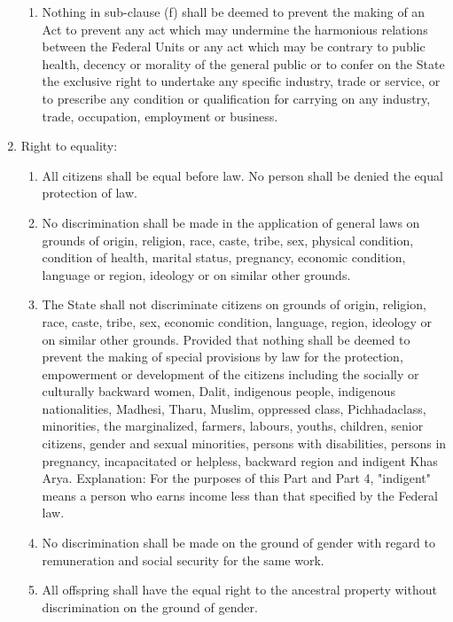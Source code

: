\begin{questions}
\begin{solution}
\begin{enumerate}
\begin{enumerate}
          \item Nothing in sub-clause (f) shall be deemed to prevent the making of an Act to prevent any act which may undermine the harmonious relations between the Federal Units or any act which may be contrary to public health, decency or morality of the general public or to confer on the State the exclusive right to undertake any specific industry, trade or service, or to prescribe any condition or qualification for carrying on any industry, trade, occupation, employment or business.
      \end{enumerate}

\item Right to equality:
\begin{enumerate}
    \item All citizens shall be equal before law. No person shall be denied the equal protection of law.
    \item No discrimination shall be made in the application of general laws on grounds of origin, religion, race, caste, tribe, sex, physical condition, condition of health, marital status, pregnancy, economic condition, language or region, ideology or on similar other grounds.
    \item The State shall not discriminate citizens on grounds of origin, religion, race, caste, tribe, sex, economic condition, language, region, ideology or on similar other grounds. Provided that nothing shall be deemed to prevent the making of special provisions by law for the protection, empowerment or development of the citizens including the socially or culturally backward women, Dalit, indigenous people, indigenous nationalities, Madhesi, Tharu, Muslim, oppressed class, Pichhadaclass, minorities, the marginalized, farmers, labours, youths, children, senior citizens, gender and sexual minorities, persons with disabilities, persons in pregnancy, incapacitated or helpless, backward region and indigent Khas Arya.
  Explanation: For the purposes of this Part and Part 4, "indigent" means a person who earns income less than that specified by the Federal law.
    \item No discrimination shall be made on the ground of gender with regard to remuneration and social security for the same work.
    \item All offspring shall have the equal right to the ancestral property without discrimination on the ground of gender.
\end{enumerate}


\end{enumerate}
\end{solution}
\end{questions}

